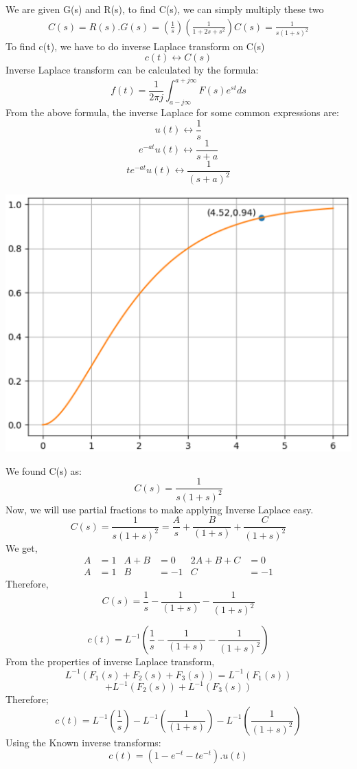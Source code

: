\documentclass[journal,12pt,twocolumn]{IEEEtran}
\renewcommand\thesection{\arabic{section}}
\begin{document}
\begin{enumerate}[label=\arabic*.,ref=\thesection.\theenumi]
We are given G(s) and R(s), to find C(s), we can simply multiply these two
\begin{align}
C(s) = R(s).G(s) = (\frac{1}{s})  (\frac{1}{1+2s+s^2})
C(s) =  \frac{1}{s(1+s)^2}
\end{align}
To find c(t), we have to do inverse Laplace transform on C(s)
$$c(t) \longleftrightarrow C(s)$$
Inverse Laplace transform can be calculated by the formula:
$$f(t) = \frac{1}{2\pi j} \int_{a -j\infty}^{a+j\infty}F(s)e^{st} ds$$
From the above formula, the inverse Laplace for some common expressions are:
$$u(t) \longleftrightarrow \frac{1}{s}$$
$$e^{-at} u(t) \longleftrightarrow \frac{1}{s+a}$$
$$t e^{-at} u(t) \longleftrightarrow \frac{1}{(s+a)^2}$$

\includegraphics[scale=0.5]{./figs/plot.eps}

We found C(s) as:
$$C(s) =  \frac{1}{s(1+s)^2}$$
Now, we will use partial fractions to make applying Inverse Laplace easy.
$$C(s) =  \frac{1}{s(1+s)^2} =  \frac{A}{s} + \frac{B}{(1+s)} + \frac{C}{(1+s)^2}$$
We get, 
\begin{align*}
A &= 1 & A+B &=0 & 2A+B+C &= 0 \\
A &=1 & B &=-1 & C &=-1
\end{align*}
Therefore,
$$C(s) = \frac{1}{s} - \frac{1}{(1+s)} - \frac{1}{(1+s)^2}$$

$$c(t) = L^{-1} ( \frac{1}{s} - \frac{1}{(1+s)} - \frac{1}{(1+s)^2}) $$
From the properties of inverse Laplace transform,
$$L^{-1} (F_1(s) + F_2(s) + F_3(s)) = L^{-1}(F_1(s)) $$ 
$$ + L^{-1}(F_2(s)) + L^{-1}(F_3(s))$$
Therefore;
$$c(t) = L^{-1} ( \frac{1}{s}) - L^{-1}(\frac{1}{(1+s)}) - L^{-1}(\frac{1}{(1+s)^2}) $$
Using the Known inverse transforms:
$$c(t) = (1 - e^{-t} - te^{-t}) . u(t)$$


\end{enumerate}
\end{document}

